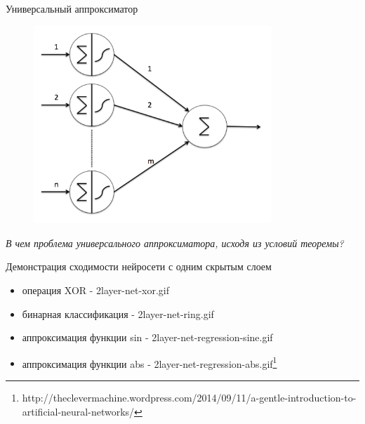 \documentclass[10pt]{beamer}
\begin{document}
\begin{frame}{Универсальный аппроксиматор}

\begin{figure}[h!]
\centering
\includegraphics[width=0.8\textwidth]{images/universal_approximator.png}
\end{figure}
\textit{В чем проблема универсального аппроксиматора, исходя из условий теоремы?}

\end{frame}


\begin{frame}{Демонстрация сходимости нейросети с одним скрытым слоем}

\begin{itemize}
	\item операция XOR - 2layer-net-xor.gif
	\item бинарная классификация - 2layer-net-ring.gif
	\item аппроксимация функции sin - 2layer-net-regression-sine.gif
	\item аппроксимация функции abs - 2layer-net-regression-abs.gif\footnote{http://theclevermachine.wordpress.com/2014/09/11/a-gentle-introduction-to-artificial-neural-networks/}
\end{itemize}

\end{frame}
\end{document}
